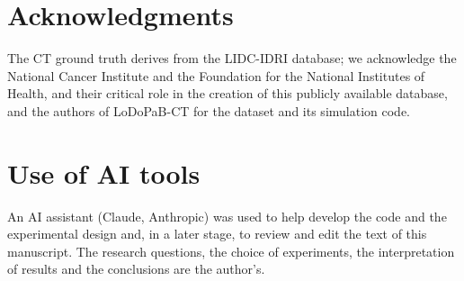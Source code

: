 \section*{Acknowledgments}

The CT ground truth derives from the LIDC-IDRI database; we acknowledge the National Cancer Institute and
the Foundation for the National Institutes of Health, and their critical role in the creation of this
publicly available database, and the authors of LoDoPaB-CT for the dataset and its simulation code.

\section*{Use of AI tools}

An AI assistant (Claude, Anthropic) was used to help develop the code and the experimental design and, in a later stage, to review and edit the text of this manuscript. The research
questions, the choice of experiments, the interpretation of results and the conclusions are the author's. 

